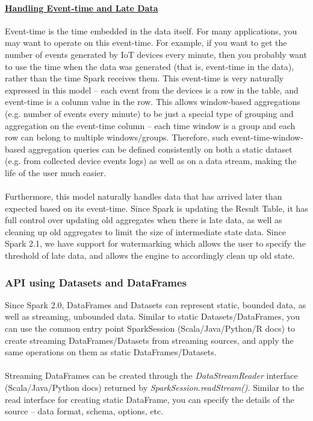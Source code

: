 \documentclass[10pt,a4paper]{article}
\newcommand{\nline}{\\~\\}
\begin{document}
 \paragraph{\uline{Handling Event-time and Late Data}}
 Event-time is the time embedded in the data itself. For many applications, you may want to operate on this event-time. For example, if you want to get the number of events generated by IoT devices every minute, then you probably want to use the time when the data was generated (that is, event-time in the data), rather than the time Spark receives them. This event-time is very naturally expressed in this model – each event from the devices is a row in the table, and event-time is a column value in the row. This allows window-based aggregations (e.g. number of events every minute) to be just a special type of grouping and aggregation on the event-time column – each time window is a group and each row can belong to multiple windows/groups. Therefore, such event-time-window-based aggregation queries can be defined consistently on both a static dataset (e.g. from collected device events logs) as well as on a data stream, making the life of the user much easier. 
 \nline
 Furthermore, this model naturally handles data that has arrived later than expected based on its event-time. Since Spark is updating the Result Table, it has full control over updating old aggregates when there is late data, as well as cleaning up old aggregates to limit the size of intermediate state data. Since Spark 2.1, we have support for watermarking which allows the user to specify the threshold of late data, and allows the engine to accordingly clean up old state.
 \subsubsection{API using Datasets and DataFrames}
 Since Spark 2.0, DataFrames and Datasets can represent static, bounded data, as well as streaming, unbounded data. Similar to static Datasets/DataFrames, you can use the common entry point SparkSession (Scala/Java/Python/R docs) to create streaming DataFrames/Datasets from streaming sources, and apply the same operations on them as static DataFrames/Datasets. 
 \nline
 Streaming DataFrames can be created through the \textit{DataStreamReader} interface (Scala/Java/Python docs) returned by \textit{SparkSession.readStream()}. Similar to the read interface for creating static DataFrame, you can specify the details of the source – data format, schema, options, etc.
\end{document}
